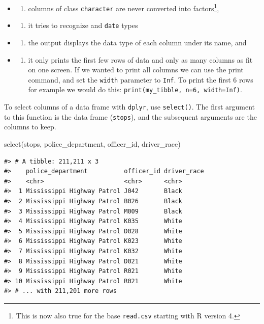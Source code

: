 \documentclass[
]{book}
\newenvironment{Shaded}{\begin{snugshade}}{\end{snugshade}}
\newcommand{\FunctionTok}[1]{\textcolor[rgb]{0.00,0.00,0.00}{#1}}
\newcommand{\NormalTok}[1]{#1}
\providecommand{\tightlist}{%
  \setlength{\itemsep}{0pt}\setlength{\parskip}{0pt}}
\begin{document}
\begin{itemize}
\item
  \begin{enumerate}
  \def\labelenumi{(\arabic{enumi})}
  \tightlist
  \item
    columns of class \texttt{character} are never converted into factors\footnote{This is now also true for the base \texttt{read.csv} starting with R version 4.},
  \end{enumerate}
\item
  \begin{enumerate}
  \def\labelenumi{(\arabic{enumi})}
  \setcounter{enumi}{1}
  \tightlist
  \item
    it tries to recognize and \texttt{date} types
  \end{enumerate}
\item
  \begin{enumerate}
  \def\labelenumi{(\arabic{enumi})}
  \setcounter{enumi}{2}
  \tightlist
  \item
    the output displays the data type of each column under its name, and
  \end{enumerate}
\item
  \begin{enumerate}
  \def\labelenumi{(\arabic{enumi})}
  \setcounter{enumi}{3}
  \tightlist
  \item
    it only prints the first few rows of data and only as many columns as
    fit on one screen. If we wanted to print all columns we can use the print command, and set the \texttt{width} parameter to \texttt{Inf}. To print the first 6 rows for example we would do this: \texttt{print(my\_tibble,\ n=6,\ width=Inf)}.
  \end{enumerate}
\end{itemize}

To select columns of a
data frame with \texttt{dplyr}, use \texttt{select()}. The first argument to this function is the data
frame (\texttt{stops}), and the subsequent arguments are the columns to keep.

\begin{Shaded}
\begin{Highlighting}[]
\FunctionTok{select}\NormalTok{(stops, police\_department, officer\_id, driver\_race)}
\end{Highlighting}
\end{Shaded}

\begin{verbatim}
#> # A tibble: 211,211 x 3
#>    police_department          officer_id driver_race
#>    <chr>                      <chr>      <chr>      
#>  1 Mississippi Highway Patrol J042       Black      
#>  2 Mississippi Highway Patrol B026       Black      
#>  3 Mississippi Highway Patrol M009       Black      
#>  4 Mississippi Highway Patrol K035       White      
#>  5 Mississippi Highway Patrol D028       White      
#>  6 Mississippi Highway Patrol K023       White      
#>  7 Mississippi Highway Patrol K032       White      
#>  8 Mississippi Highway Patrol D021       White      
#>  9 Mississippi Highway Patrol R021       White      
#> 10 Mississippi Highway Patrol R021       White      
#> # ... with 211,201 more rows
\end{verbatim}
\end{document}
